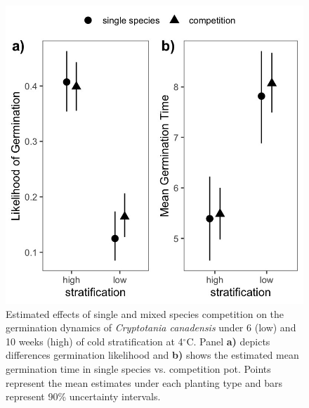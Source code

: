 \documentclass{article}[11pt]
\begin{document}
\begin{figure}[h!]
    \centering
\includegraphics[width=.7\textwidth]{..//figure/nichemodfication.jpeg}
   \caption{Estimated effects of single and mixed species competition on the germination dynamics of \textit{Cryptotania canadensis} under 6 (low) and 10 weeks (high) of cold stratification at 4$^{\circ}$C. Panel \textbf{a)} depicts differences germination likelihood and \textbf{b)} shows the estimated mean germination time in single species vs. competition pot. Points represent the mean estimates under each planting type and bars represent 90\% uncertainty intervals. } 
   \label{fig:nichemod}
\end{figure}

\end{document}

